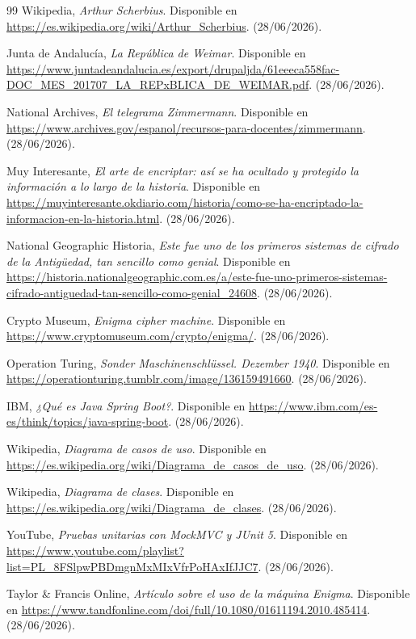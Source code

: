 \begin{thebibliography}{99}
 Wikipedia, {\it Arthur Scherbius}. Disponible en \url{https://es.wikipedia.org/wiki/Arthur_Scherbius}. (28/06/2026).

 Junta de Andalucía, {\it La República de Weimar}. Disponible en \url{https://www.juntadeandalucia.es/export/drupaljda/61eeeca558fac-DOC_MES_201707_LA_REPxBLICA_DE_WEIMAR.pdf}. (28/06/2026).

 National Archives, {\it El telegrama Zimmermann}. Disponible en \url{https://www.archives.gov/espanol/recursos-para-docentes/zimmermann}. (28/06/2026).

 Muy Interesante, {\it El arte de encriptar: así se ha ocultado y protegido la información a lo largo de la historia}. Disponible en \url{https://muyinteresante.okdiario.com/historia/como-se-ha-encriptado-la-informacion-en-la-historia.html}. (28/06/2026).

 National Geographic Historia, {\it Este fue uno de los primeros sistemas de cifrado de la Antigüedad, tan sencillo como genial}. Disponible en \url{https://historia.nationalgeographic.com.es/a/este-fue-uno-primeros-sistemas-cifrado-antiguedad-tan-sencillo-como-genial_24608}. (28/06/2026).

 Crypto Museum, {\it Enigma cipher machine}. Disponible en \url{https://www.cryptomuseum.com/crypto/enigma/}. (28/06/2026).

 Operation Turing, {\it Sonder Maschinenschlüssel. Dezember 1940}. Disponible en \url{https://operationturing.tumblr.com/image/136159491660}. (28/06/2026).

 IBM, {\it ¿Qué es Java Spring Boot?}. Disponible en \url{https://www.ibm.com/es-es/think/topics/java-spring-boot}. (28/06/2026).

 Wikipedia, {\it Diagrama de casos de uso}. Disponible en \url{https://es.wikipedia.org/wiki/Diagrama_de_casos_de_uso}. (28/06/2026).

 Wikipedia, {\it Diagrama de clases}. Disponible en \url{https://es.wikipedia.org/wiki/Diagrama_de_clases}. (28/06/2026).

 YouTube, {\it Pruebas unitarias con MockMVC y JUnit 5}. Disponible en \url{https://www.youtube.com/playlist?list=PL_8FSlpwPBDmgnMxMIxVfrPoHAxIfJJC7}. (28/06/2026).

 Taylor \& Francis Online, {\it Artículo sobre el uso de la máquina Enigma}. Disponible en \url{https://www.tandfonline.com/doi/full/10.1080/01611194.2010.485414}. (28/06/2026).

\end{thebibliography}
